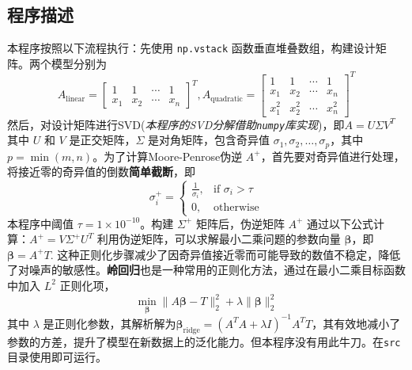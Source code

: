\subsection{程序描述}
本程序按照以下流程执行：先使用 \texttt{np.vstack} 函数垂直堆叠数组，构建设计矩阵。两个模型分别为
\[
A_{\text{linear}} = \begin{bmatrix} 1 & 1 & \cdots & 1 \\ x_1 & x_2 & \cdots & x_n \end{bmatrix}^T, A_{\text{quadratic}} = \begin{bmatrix} 1 & 1 & \cdots & 1 \\ x_1 & x_2 & \cdots & x_n \\ x_1^2 & x_2^2 & \cdots & x_n^2 \end{bmatrix}^T
\]
然后，对设计矩阵进行SVD(\textit{本程序的SVD分解借助\texttt{numpy}库实现})，即\(A = U \Sigma V^T\)
其中 \( U \) 和 \( V \) 是正交矩阵，\( \Sigma \) 是对角矩阵，包含奇异值 \( \sigma_1, \sigma_2, \dots, \sigma_p \)，其中 \( p = \min(m, n) \)。为了计算Moore-Penrose伪逆 \( A^+ \)，首先要对奇异值进行处理，将接近零的奇异值的倒数\textbf{简单截断}，即
\[
\sigma_i^+ = 
\begin{cases}
\frac{1}{\sigma_i}, & \text{if } \sigma_i > \tau \\
0, & \text{otherwise}
\end{cases}
\]
本程序中阈值 \( \tau = 1 \times 10^{-10} \)。构建 \( \Sigma^+ \) 矩阵后，伪逆矩阵 \( A^+ \) 通过以下公式计算：\(A^+ = V \Sigma^+ U^T\)
利用伪逆矩阵，可以求解最小二乘问题的参数向量 \( \boldsymbol{\beta} \)，即\(
\boldsymbol{\beta} = A^+ T\).
这种正则化步骤减少了因奇异值接近零而可能导致的数值不稳定，降低了对噪声的敏感性。\textbf{岭回归}也是一种常用的正则化方法，通过在最小二乘目标函数中加入 \( L^2 \) 正则化项，
\[
\min_{\boldsymbol{\beta}} \| A\boldsymbol{\beta} - T \|_2^2 + \lambda \| \boldsymbol{\beta} \|_2^2
\]
其中 \( \lambda \) 是正则化参数，其解析解为\(\boldsymbol{\beta}_{\text{ridge}} = (A^T A + \lambda I)^{-1} A^T T\)，其有效地减小了参数的方差，提升了模型在新数据上的泛化能力。但本程序没有用此牛刀。在\texttt{src}目录使用即可运行。
